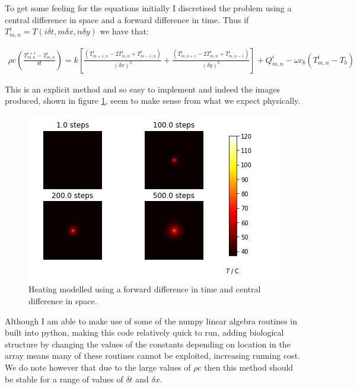 \documentclass[11pt]{article} %
\begin{document}
To get some feeling for the equations initially I discretised the problem using a central difference in space and a forward difference in time. Thus if $T^i_{m,n}= T(i\delta t, m\delta x, n\delta y)$ we have that:

\begin{eqnarray}
\rho c \left( \frac{T^{i+1}_{m,n}-T^i_{m,n}}{\delta t}\right)= k\left[  \frac{(T^i_{m+1,n}-2T^i_{m,n}+T^i_{m-1,n})}{(\delta x)^2}+\frac{(T^i_{m,n+1}-2T^i_{m,n}+T^i_{m,n-1})}{(\delta y)^2}\right] +Q^i_{m,n}-\omega c_b(T^i_{m,n}-T_b) \label{euler method}
\end{eqnarray}

This is an explicit method and so easy to implement and indeed the images produced, shown in figure \ref{fig:forwardcentraldifference}, seem to make sense from what we expect physically. 

\begin{figure}
	\centering
	\includegraphics[width=0.9\linewidth]{Report_images/forward_central_difference}
	\caption{Heating modelled using a forward difference in time and central difference in space.}
	\label{fig:forwardcentraldifference}
\end{figure}

Although I am able to make use of some of the numpy linear algebra routines in built into python, making this code relatively quick to run, adding biological structure by changing the values of the constants depending on location in the array means many of these routines cannot be exploited, increasing running cost. We do note however that due to the large values of $\rho c$ then this method should be stable for a range of values of $\delta t$ and $\delta x$.
\end{document}
